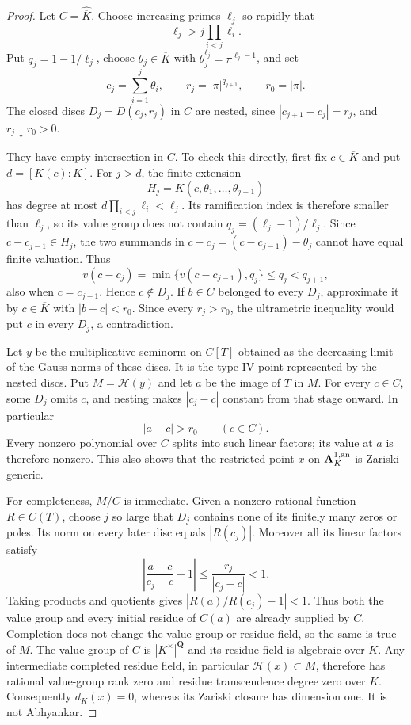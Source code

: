 \documentclass[11pt,a4paper]{article}
\numberwithin{equation}{section}
\theoremstyle{definition}
\theoremstyle{remark}
\begin{document}
\begin{proof}
Let $C=\widehat{\overline K}$.  Choose increasing primes
$\ell_j$ so rapidly that
\[
 \ell_j>j\prod_{i<j}\ell_i.
\]
Put $q_j=1-1/\ell_j$, choose
$\theta_j\in\overline K$ with $\theta_j^{\ell_j}=\pi^{\ell_j-1}$,
and set
\[
 c_j=\sum_{i=1}^j\theta_i,\qquad
 r_j=|\pi|^{q_{j+1}},\qquad r_0=|\pi|.
\]
The closed discs $D_j=D(c_j,r_j)$ in $C$ are nested, since
$|c_{j+1}-c_j|=r_j$, and $r_j\downarrow r_0>0$.

They have empty intersection in $C$.  To check this directly,
first fix $c\in\overline K$ and put $d=[K(c):K]$.
For $j>d$, the finite extension
\[
 H_j=K(c,\theta_1,\ldots,\theta_{j-1})
\]
has degree at most $d\prod_{i<j}\ell_i<\ell_j$.  Its ramification
index is therefore smaller than $\ell_j$, so its value group
does not contain $q_j=(\ell_j-1)/\ell_j$.
Since $c-c_{j-1}\in H_j$, the two summands in
$c-c_j=(c-c_{j-1})-\theta_j$ cannot have equal finite valuation.
Thus
\[
 v(c-c_j)=\min\{v(c-c_{j-1}),q_j\}\leq q_j<q_{j+1},
\]
also when $c=c_{j-1}$.  Hence $c\notin D_j$.
If $b\in C$ belonged to every $D_j$, approximate it by
$c\in\overline K$ with $|b-c|<r_0$.  Since every $r_j>r_0$,
the ultrametric inequality would put $c$ in every $D_j$, a
contradiction.

Let $y$ be the multiplicative seminorm on $C[T]$ obtained as the
decreasing limit of the Gauss norms of these discs.  It is the
type-IV point represented by the nested discs.  Put
$M=\mathscr H(y)$ and let $a$ be the image of $T$ in $M$.
For every $c\in C$, some $D_j$ omits $c$, and nesting makes
$|c_j-c|$ constant from that stage onward.  In particular
\begin{equation}\label{eq:r5-type-four-strict-distance}
 |a-c|>r_0\qquad(c\in C).
\end{equation}
Every nonzero polynomial over $C$ splits into such linear factors;
its value at $a$ is therefore nonzero.  This also shows that the
restricted point $x$ on $\mathbf A_K^{1,\rm an}$ is Zariski generic.

For completeness, $M/C$ is immediate.  Given a nonzero rational
function $R\in C(T)$, choose $j$ so large that $D_j$ contains none
of its finitely many zeros or poles.  Its norm on every later disc
equals $|R(c_j)|$.  Moreover all its linear factors satisfy
\[
 \left|\frac{a-c}{c_j-c}-1\right|
       \leq\frac{r_j}{|c_j-c|}<1.
\]
Taking products and quotients gives
$|R(a)/R(c_j)-1|<1$.  Thus both the value group and every initial
residue of $C(a)$ are already supplied by $C$.  Completion does not
change the value group or residue field, so the same is true of
$M$.  The value group of $C$ is $|K^\times|^{\mathbf Q}$ and its
residue field is algebraic over $\widetilde K$.  Any intermediate
completed residue field, in particular $\mathscr H(x)\subset M$,
therefore has rational value-group rank zero and residue
transcendence degree zero over $K$.  Consequently $d_K(x)=0$,
whereas its Zariski closure has dimension one.  It is not
Abhyankar.


\end{proof}
\end{document}
